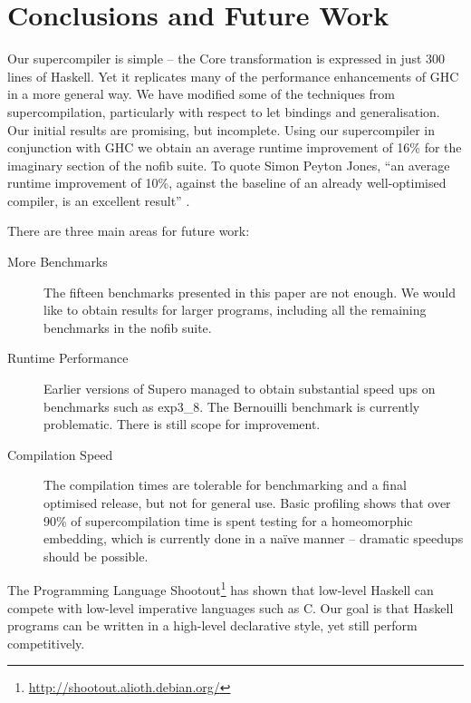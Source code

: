 \section{Conclusions and Future Work}
\label{sec:conclusion}

Our supercompiler is simple -- the Core transformation is expressed in just 300 lines of Haskell. Yet it replicates many of the performance enhancements of GHC in a more general way. We have modified some of the techniques from supercompilation, particularly with respect to let bindings and generalisation. Our initial results are promising, but incomplete. Using our supercompiler in conjunction with GHC we obtain an average runtime improvement of 16\% for the imaginary section of the nofib suite. To quote Simon Peyton Jones, ``an average runtime improvement of 10\%, against the baseline of an already well-optimised compiler, is an excellent result'' \cite{spj:specconstr}.

There are three main areas for future work:

\begin{description}
\item[More Benchmarks] The fifteen benchmarks presented in this paper are not enough. We would like to obtain results for larger programs, including all the remaining benchmarks in the nofib suite.
\item[Runtime Performance] Earlier versions of Supero \cite{me:supero_ifl} managed to obtain substantial speed ups on benchmarks such as exp3\_8. The Bernouilli benchmark is currently problematic. There is still scope for improvement.
\item[Compilation Speed] The compilation times are tolerable for benchmarking and a final optimised release, but not for general use. Basic profiling shows that over 90\% of supercompilation time is spent testing for a homeomorphic embedding, which is currently done in a na\"{i}ve manner -- dramatic speedups should be possible.
\end{description}

The Programming Language Shootout\footnote{\url{http://shootout.alioth.debian.org/}} has shown that low-level Haskell can compete with low-level imperative languages such as C. Our goal is that Haskell programs can be written in a high-level declarative style, yet still perform competitively.

